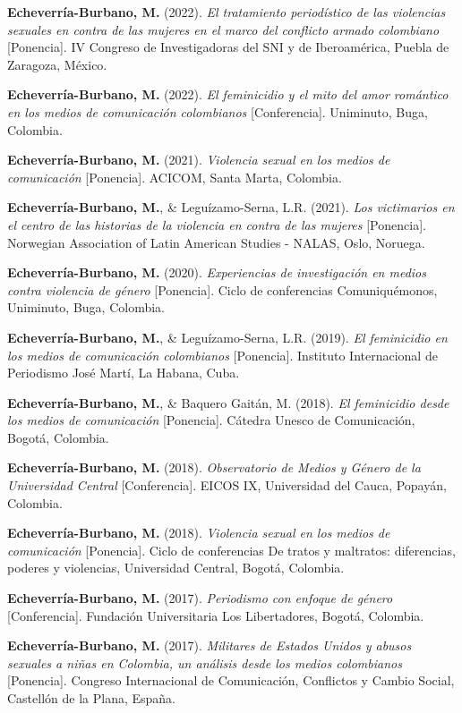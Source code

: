 \documentclass[11pt,a4paper,]{awesome-cv}
\begin{document}
\textbf{Echeverría-Burbano, M.} (2022). \emph{El tratamiento
periodístico de las violencias sexuales en contra de las mujeres en el
marco del conflicto armado colombiano} {[}Ponencia{]}. IV Congreso de
Investigadoras del SNI y de Iberoamérica, Puebla de Zaragoza, México.

\textbf{Echeverría-Burbano, M.} (2022). \emph{El feminicidio y el mito
del amor romántico en los medios de comunicación colombianos}
{[}Conferencia{]}. Uniminuto, Buga, Colombia.

\textbf{Echeverría-Burbano, M.} (2021). \emph{Violencia sexual en los
medios de comunicación} {[}Ponencia{]}. ACICOM, Santa Marta, Colombia.

\textbf{Echeverría-Burbano, M.}, \& Leguízamo-Serna, L.R. (2021).
\emph{Los victimarios en el centro de las historias de la violencia en
contra de las mujeres} {[}Ponencia{]}. Norwegian Association of Latin
American Studies - NALAS, Oslo, Noruega.

\textbf{Echeverría-Burbano, M.} (2020). \emph{Experiencias de
investigación en medios contra violencia de género} {[}Ponencia{]}.
Ciclo de conferencias Comuniquémonos, Uniminuto, Buga, Colombia.

\textbf{Echeverría-Burbano, M.}, \& Leguízamo-Serna, L.R. (2019).
\emph{El feminicidio en los medios de comunicación colombianos}
{[}Ponencia{]}. Instituto Internacional de Periodismo José Martí, La
Habana, Cuba.

\textbf{Echeverría-Burbano, M.}, \& Baquero Gaitán, M. (2018). \emph{El
feminicidio desde los medios de comunicación} {[}Ponencia{]}. Cátedra
Unesco de Comunicación, Bogotá, Colombia.

\textbf{Echeverría-Burbano, M.} (2018). \emph{Observatorio de Medios y
Género de la Universidad Central} {[}Conferencia{]}. EICOS IX,
Universidad del Cauca, Popayán, Colombia.

\textbf{Echeverría-Burbano, M.} (2018). \emph{Violencia sexual en los
medios de comunicación} {[}Ponencia{]}. Ciclo de conferencias De tratos
y maltratos: diferencias, poderes y violencias, Universidad Central,
Bogotá, Colombia.

\textbf{Echeverría-Burbano, M.} (2017). \emph{Periodismo con enfoque de
género} {[}Conferencia{]}. Fundación Universitaria Los Libertadores,
Bogotá, Colombia.

\textbf{Echeverría-Burbano, M.} (2017). \emph{Militares de Estados
Unidos y abusos sexuales a niñas en Colombia, un análisis desde los
medios colombianos} {[}Ponencia{]}. Congreso Internacional de
Comunicación, Conflictos y Cambio Social, Castellón de la Plana, España.
\end{document}

